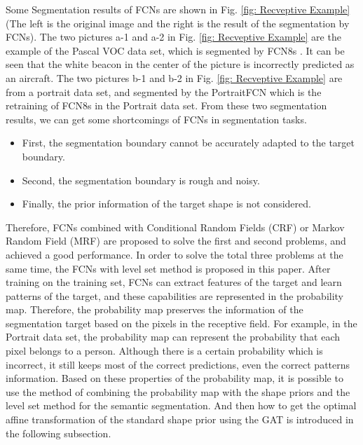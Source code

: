 Some Segmentation results of FCNs are shown in Fig. \ref{fig: Recveptive Example} (The left is the original image and the right is the result of the segmentation by FCNs). The two pictures a-1 and a-2 in Fig. \ref{fig: Recveptive Example} are the example of the Pascal VOC data set, which is segmented by FCN8s \cite{FCN-original:long2015fully}. It can be seen that the white beacon in the center of the picture is incorrectly predicted as an aircraft. The two pictures b-1 and b-2 in Fig. \ref{fig: Recveptive Example} are from a portrait data set, and segmented by the PortraitFCN \cite{FCN:segmentation:shen2016automatic} which is the retraining of FCN8s in the Portrait data set.
From these two segmentation results, we can get some shortcomings of FCNs in segmentation tasks.
\begin{itemize}\label{itemize: FCN shortcomings}
  \item First, the segmentation boundary cannot be accurately adapted to the target boundary.
  \item Second, the segmentation boundary is rough and noisy.
  \item Finally, the prior information of the target shape is not considered.
\end{itemize}

Therefore, FCNs combined with Conditional Random Fields (CRF) \cite{FCN:CRF:zheng2015conditional} or Markov Random Field (MRF) \cite{FCN:MRF:liu2015semantic} are proposed to solve the first and second problems, and achieved a good performance. In order to solve the total three problems at the same time, the FCNs with level set method is proposed in this paper. After training on the training set, FCNs can extract features of the target and learn patterns of the target, and these capabilities are represented in the probability map. Therefore, the probability map preserves the information of the segmentation target based on the pixels in the receptive field. For example, in the Portrait data set, the probability map can represent the probability that each pixel belongs to a person. Although there is a certain probability which is incorrect, it still keeps most of the correct predictions, even the correct patterns information. Based on these properties of the probability map, it is possible to use the method of combining the probability map with the shape priors and the level set method for the semantic segmentation. And then how to get the optimal affine transformation of the standard shape prior using the GAT is introduced in the following subsection.

